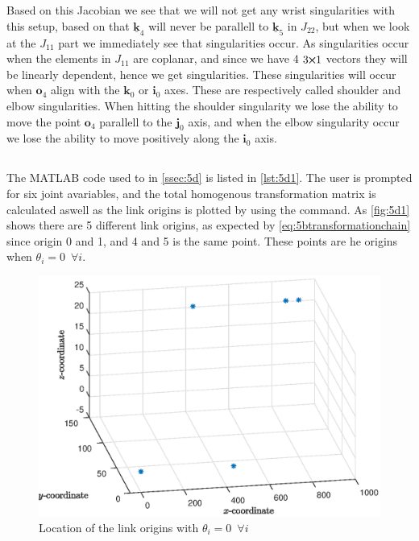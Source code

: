 \documentclass[a4paper]{scrartcl}
\begin{document}
Based on this Jacobian we see that we will not get any wrist singularities with this setup, based on that $\underline{\bm{k}}_4$ will never be parallell to $\underline{\bm{k}}_5$ in $J_{22}$, but when we look at the $J_{11}$ part we immediately see that singularities occur. As singularities occur when the elements in $J_{11}$ are coplanar, and since we have $4$ $3\!\!\cross\!\!1$ vectors they will be linearly dependent, hence we get singularities. These singularities will occur when $\bm{o}_4$ align with the $\bm{k}_0$ or $\bm{i}_0$ axes. These are respectively called shoulder and elbow singularities. When hitting the shoulder singularity we lose the ability to move the point $\bm{o}_4$ parallell to the $\bm{j}_0$ axis, and when the elbow singularity occur we lose the ability to move positively along the $\bm{i}_0$ axis.


\subsection{}\label{ssec:5d} %
The MATLAB code used to in \autoref{ssec:5d} is listed in \autoref{lst:5d1}. The user is prompted for six joint avariables, and the total homogenous transformation matrix is calculated aswell as the link origins is plotted by using the  command. As \autoref{fig:5d1} shows there are 5 different link origins, as expected by \eqref{eq:5btransformationchain} since origin 0 and 1, and 4 and 5 is the same point. These points are he origins when $\theta_i = 0 \enspace \forall i$.

\begin{figure}[ht!]
    \centering
    \includegraphics[width = .95\textwidth]{5d_new.eps}
    \caption{Location of the link origins with $\theta_i = 0 \enspace \forall i$}
    \label{fig:5d1}
\end{figure}
\end{document}
